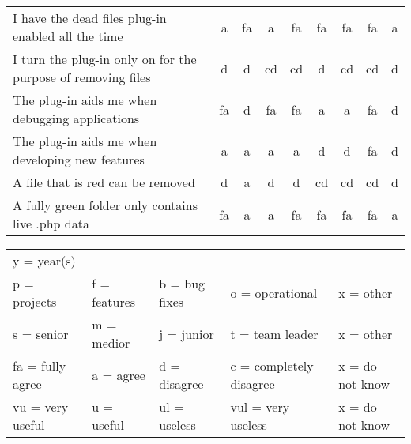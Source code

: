 \begin{sidewaystable}
\begin{tabular}{p{9cm}cccccccc}
\\I have the dead files plug-in enabled all the time            &  a & fa &  a & fa & fa & fa & fa & a
\\I turn the plug-in only on for the purpose of removing files  &  d &  d & cd & cd &  d & cd & cd & d
\\The plug-in aids me when debugging applications               & fa &  d & fa & fa &  a &  a & fa & d
\\The plug-in aids me when developing new features              &  a &  a &  a &  a &  d &  d & fa & d
\\A file that is red can be removed                             &  d &  a &  d &  d & cd & cd & cd & d
\\A fully green folder only contains live .php data             & fa &  a &  a & fa & fa & fa & fa & a



\end{tabular}

\flushright
\scriptsize
\begin{tabular}{|lllll|}
\hline
y = year(s) &&&& \\
p = projects & f = features & b = bug fixes & o = operational & x = other \\
s = senior & m = medior & j = junior & t = team leader & x = other \\
fa = fully agree & a = agree & d = disagree & c = completely disagree & x = do not know \\
vu = very useful & u = useful & ul = useless & vul = very useless & x = do not know \\
\hline
\end{tabular}
\end{sidewaystable}